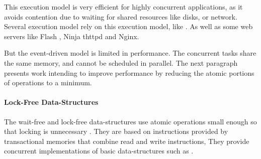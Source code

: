 This execution model is very efficient for highly concurrent applications, as it avoids contention due to waiting for shared resources like disks, or network.
Several execution model rely on this execution model, like .
As well as some web servers like Flash \cite{Pai1999}, Ninja \cite{Gribble2001} thttpd and Nginx.




But the event-driven model is limited in performance.
The concurrent tasks share the same memory, and cannot be scheduled in parallel.
The next paragraph presents work intending to improve performance by reducing the atomic portions of operations to a minimum. %

\paragraph{Lock-Free Data-Structures}

The wait-free and lock-free data-structures use atomic operations small enough so that locking is unnecessary \cite{Lamport1977,Herlihy1988,Herlihy1990,Herlihy1991,Anderson1990}.
They are based on instructions provided by transactional memories \cite{Harris2010} that combine read and write instructions,
They provide concurrent implementations of basic data-structures such as .

